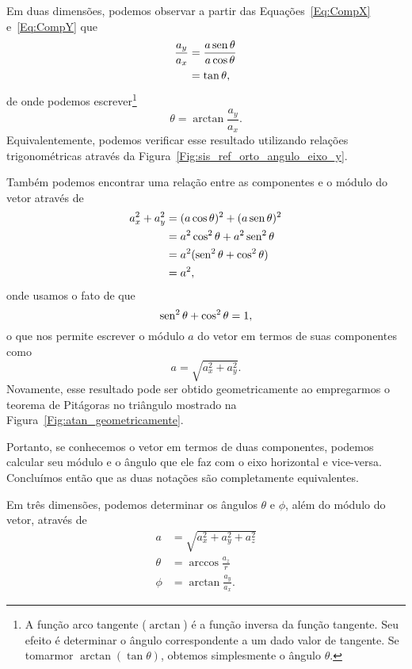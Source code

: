 Em duas dimensões, podemos observar a partir das Equações~\eqref{Eq:CompX} e~\eqref{Eq:CompY} que
\begin{align}
  \frac{a_y}{a_x} &=\frac{a\operatorname{sen}\theta}{a\cos\theta} \\
  &= \tan\theta,
\end{align}
%
de onde podemos escrever\footnote{A função arco tangente ($\arctan$) é a função inversa da função tangente. Seu efeito é determinar o ângulo correspondente a um dado valor de tangente. Se tomarmor $\arctan(\tan \theta)$, obtemos simplesmente o ângulo $\theta$.}
\begin{equation}\label{Eq:AngaPartirDeComp}
  \theta = \arctan\frac{a_y}{a_x}.
\end{equation}
%
Equivalentemente, podemos verificar esse resultado utilizando relações trigonométricas através da  Figura~\ref{Fig:sis_ref_orto_angulo_eixo_y}.

Também podemos encontrar uma relação entre as componentes e o módulo do vetor através de
\begin{align}
  a_ x^2 + a_y^2 &= (a\cos\theta) ^2 + (a\operatorname{sen}\theta)^2 \\
  &= a^2\cos^2\theta + a^2\operatorname{sen}^2\theta \\
  &= a^2(\operatorname{sen}^2\theta + \cos^2\theta) \\
  &= a^2,
\end{align}
%
onde usamos o fato de que
\begin{equation}
    \operatorname{sen}^2\theta + \cos^2\theta = 1,
\end{equation}
%
o que nos permite escrever o módulo $a$ do vetor em termos de suas componentes como
\begin{equation}\label{Eq:ModAPartirDeComp}
    a = \sqrt{a_x^2 + a_y^2}.
\end{equation}
%
Novamente, esse resultado pode ser obtido geometricamente ao empregarmos o teorema de Pitágoras no triângulo mostrado na Figura~\ref{Fig:atan_geometricamente}.

Portanto, se conhecemos o vetor em termos de duas componentes, podemos calcular seu módulo e o ângulo que ele faz com o eixo horizontal e vice-versa. Concluímos então que as duas notações são completamente equivalentes.

Em três dimensões, podemos determinar os ângulos $\theta$ e $\phi$, além do módulo do vetor, através de
\begin{align}
    a &= \sqrt{a_x^2 + a_y^2 + a_z^2} \\
    \theta &= \arccos \frac{a_z}{r} \\
    \phi &= \arctan \frac{a_y}{a_x}.
\end{align}

